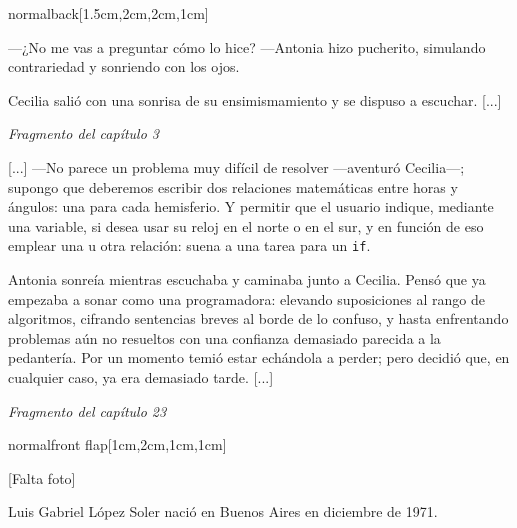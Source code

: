 \documentclass[coverwidth=148mm, coverheight=210mm, spinewidth=37mm,
flapwidth=7cm, wrapwidth=3mm, 11pt]{bookcover}
\begin{document}
\begin{bookcover}
\begin{bookcoverelement}{normal}{back}[1.5cm,2cm,2cm,1cm]
{      \hspace{.5em} ---¿No me vas a preguntar cómo lo hice? ---Antonia
      hizo pucherito, simulando contrariedad y sonriendo con los ojos.

      \hspace{.5em} Cecilia salió con una sonrisa de su
      ensimismamiento y se dispuso a escuchar. [...]
  

  \begin{flushright}
    \emph{Fragmento del capítulo 3}
  \end{flushright}

  \vspace{2.5em}
  
  \hspace{.5em} [...] ---No parece un problema muy difícil de resolver
  ---a\-ven\-tu\-ró Cecilia---; supongo que deberemos escribir dos
  relaciones matemáticas entre horas y ángulos: una para cada
  hemisferio. Y permitir que el usuario indique, mediante una
  variable, si desea usar su reloj en el norte o en el sur, y en
  función de eso emplear una u otra relación: suena a una tarea para
  un \texttt{if}.

  \hspace{.5em} Antonia sonreía mientras escuchaba y caminaba junto a
  Cecilia. Pensó que ya empezaba a sonar como una programadora:
  elevando suposiciones al rango de algoritmos, cifrando sentencias
  breves al borde de lo confuso, y hasta enfrentando problemas aún no
  resueltos con una confianza demasiado parecida a la pedantería. Por
  un momento temió estar echándola a perder; pero decidió que, en
  cualquier caso, ya era demasiado tarde. [...]

  \begin{flushright}
    \emph{Fragmento del capítulo 23}
  \end{flushright}
}
  
  \end{bookcoverelement}

  \begin{bookcoverelement}{normal}{front flap}[1cm,2cm,1cm,1cm]

    \begin{center}
      \vspace{2cm}
      [Falta foto]
      \vspace{2cm}
    \end{center}

    \bigskip
    
    \color{black} Luis Gabriel López Soler nació en Buenos Aires en
    diciembre de 1971.


\end{bookcoverelement}
\end{bookcover}
\end{document}
